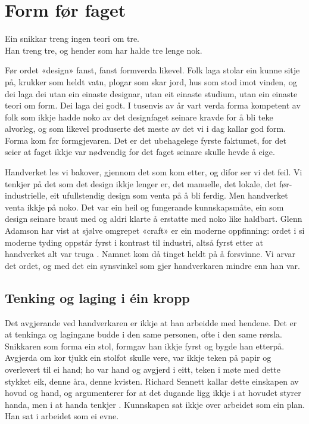 \chapter{Form før faget}

\begin{motto}
Ein snikkar treng ingen teori om tre.\\ Han treng tre, og hender som har halde tre lenge nok.
\end{motto}

Før ordet «design» fanst, fanst formverda likevel. Folk laga stolar ein kunne sitje på, krukker som heldt vatn, plogar som skar jord, hus som stod imot vinden, og dei laga dei utan ein einaste designar, utan eit einaste studium, utan ein einaste teori om form. Dei laga dei godt. I tusenvis av år vart verda forma kompetent av folk som ikkje hadde noko av det designfaget seinare kravde for å bli teke alvorleg, og som likevel produserte det meste av det vi i dag kallar god form. Forma kom før formgjevaren. Det er det ubehagelege fyrste faktumet, for det seier at faget ikkje var nødvendig for det faget seinare skulle hevde å eige.

Handverket les vi bakover, gjennom det som kom etter, og difor ser vi det feil. Vi tenkjer på det som det design ikkje lenger er, det manuelle, det lokale, det før-industrielle, eit ufullstendig design som venta på å bli ferdig. Men handverket venta ikkje på noko. Det var ein heil og fungerande kunnskapsmåte, ein som design seinare braut med og aldri klarte å erstatte med noko like haldbart. Glenn Adamson har vist at sjølve omgrepet «craft» er ein moderne oppfinning: ordet i si moderne tyding oppstår fyrst i kontrast til industri, altså fyrst etter at handverket alt var truga \autocite{adamson2013invention}. Namnet kom då tinget heldt på å forsvinne. Vi arvar det ordet, og med det ein synsvinkel som gjer handverkaren mindre enn han var.

\section{Tenking og laging i éin kropp}

Det avgjerande ved handverkaren er ikkje at han arbeidde med hendene. Det er at tenkinga og lagingane budde i den same personen, ofte i den same rørsla. Snikkaren som forma ein stol, formgav han ikkje fyrst og bygde han etterpå. Avgjerda om kor tjukk ein stolfot skulle vere, var ikkje teken på papir og overlevert til ei hand; ho var hand og avgjerd i eitt, teken i møte med dette stykket eik, denne åra, denne kvisten. Richard Sennett kallar dette einskapen av hovud og hand, og argumenterer for at det dugande ligg ikkje i at hovudet styrer handa, men i at handa tenkjer \autocite{sennett2008craftsman}. Kunnskapen sat ikkje over arbeidet som ein plan. Han sat i arbeidet som ei evne.

